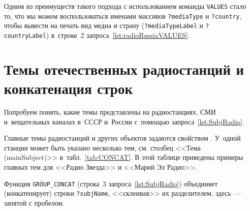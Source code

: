 Одним из преимуществ такого подхода с использованием команды \lstinline|VALUES| 
стало то, что мы можем воспользоваться именами массивов \lstinline|?mediaType| и \lstinline|?country|, 
чтобы вывести на печать вид медиа и страну 
(\lstinline|?mediaTypeLabel| и \lstinline|?countryLabel|) 
в~строке~2 запроса~\ref{lst:radioRussiaVALUES}.

 








\newpage
\section{Темы отечественных радиостанций и конкатенация строк}

Попробуем понять, какие темы представлены на радиостанциях, СМИ и~вещательных каналах в~СССР и~России 
с~помощью запроса~\ref{lst:SubjRadio}. 

Главные темы радиостанций и других объектов задаются свойством . 
У~одной станции может быть указано несколько тем, 
см. столбец <<Тема (mainSubject)>> в~табл.~\ref{tab:CONCAT}. 
В этой таблице приведены примеры главных тем для <<Радио Звезда>> и <<Марий Эл Радио>>.

Функция \lstinline|GROUP_CONCAT| (строка~3 запроса~\ref{lst:SubjRadio}) 
объединяет (конкатенирует) строки \lstinline|?subjName|, <<склеивая>> их разделителем, 
здесь~--- запятой с пробелом. 


